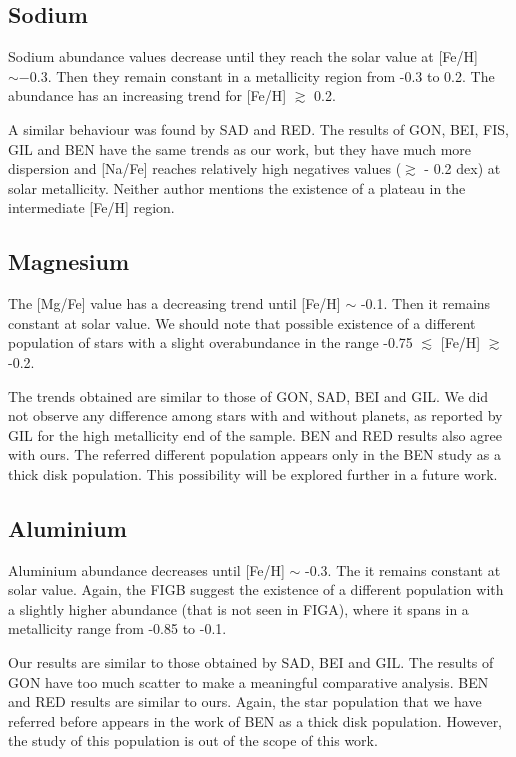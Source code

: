 \documentclass[dvips,12pt,a4paper]{report}
\begin{document}
{{\subsection{Sodium}

Sodium abundance values decrease until they reach the solar value at [Fe/H] $\sim -0.3$. Then they remain constant in a metallicity region from -0.3 to 0.2. The abundance has an increasing trend for [Fe/H] $\gtrsim$ 0.2. 

A similar behaviour was found by SAD and RED. The results of GON, BEI, FIS, GIL and BEN have the same trends as our work, but they have much more dispersion and [Na/Fe] reaches relatively high negatives values ($\gtrsim$ - 0.2 dex) at solar metallicity. Neither author mentions the existence of a plateau in the intermediate [Fe/H] region. 

\subsection {Magnesium}

The [Mg/Fe] value has a decreasing trend until [Fe/H] $\sim$ -0.1. Then it remains constant at solar value. We should note that possible existence of a different population of stars with a slight overabundance in the range -0.75 $\lesssim$ [Fe/H] $\gtrsim$ -0.2.

The trends obtained are similar to those of GON, SAD, BEI and GIL. We did not observe any difference among stars with and without planets, as reported by GIL for the high metallicity end of the sample. BEN and RED results also agree with ours. The referred different population appears only in the BEN study as a thick disk population. This possibility will be explored further in a future work.

\subsection {Aluminium}

Aluminium abundance decreases until [Fe/H] $\sim$ -0.3. The it remains constant at solar value. Again, the FIGB suggest the existence of a different population with a slightly higher abundance (that is not seen in FIGA), where it spans in a metallicity range from -0.85 to -0.1. 

Our results are similar to those obtained by SAD, BEI and GIL. The results of GON have too much scatter to make a meaningful comparative analysis. BEN and RED results are similar to ours. Again, the star population that we have referred before appears in the work of BEN as a thick disk population. However, the study of this population is out of the scope of this work.

}}
\end{document}

